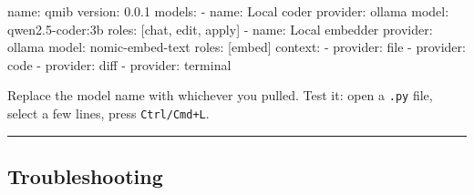 \documentclass[
  letterpaper,
  10pt,
  twoside,
  openright,
  numbers=noenddot,
  chapterprefix=true]{scrbook}
\newenvironment{Shaded}{}{}
\newcommand{\AttributeTok}[1]{\textcolor[rgb]{0.84,0.23,0.29}{#1}}
\newcommand{\FloatTok}[1]{\textcolor[rgb]{0.00,0.36,0.77}{#1}}
\newcommand{\FunctionTok}[1]{\textcolor[rgb]{0.44,0.26,0.76}{#1}}
\newcommand{\KeywordTok}[1]{\textcolor[rgb]{0.84,0.23,0.29}{#1}}
\begin{document}
\begin{Shaded}
\begin{Highlighting}[]
\FunctionTok{name}\KeywordTok{:}\AttributeTok{ qmib}
\FunctionTok{version}\KeywordTok{:}\AttributeTok{ }\FloatTok{0.0.1}
\FunctionTok{models}\KeywordTok{:}
\AttributeTok{  }\KeywordTok{{-}}\AttributeTok{ }\FunctionTok{name}\KeywordTok{:}\AttributeTok{ Local coder}
\AttributeTok{    }\FunctionTok{provider}\KeywordTok{:}\AttributeTok{ ollama}
\AttributeTok{    }\FunctionTok{model}\KeywordTok{:}\AttributeTok{ qwen2.5{-}coder:3b}
\AttributeTok{    }\FunctionTok{roles}\KeywordTok{:}\AttributeTok{ }\KeywordTok{[}\AttributeTok{chat}\KeywordTok{,}\AttributeTok{ edit}\KeywordTok{,}\AttributeTok{ apply}\KeywordTok{]}
\AttributeTok{  }\KeywordTok{{-}}\AttributeTok{ }\FunctionTok{name}\KeywordTok{:}\AttributeTok{ Local embedder}
\AttributeTok{    }\FunctionTok{provider}\KeywordTok{:}\AttributeTok{ ollama}
\AttributeTok{    }\FunctionTok{model}\KeywordTok{:}\AttributeTok{ nomic{-}embed{-}text}
\AttributeTok{    }\FunctionTok{roles}\KeywordTok{:}\AttributeTok{ }\KeywordTok{[}\AttributeTok{embed}\KeywordTok{]}
\FunctionTok{context}\KeywordTok{:}
\AttributeTok{  }\KeywordTok{{-}}\AttributeTok{ }\FunctionTok{provider}\KeywordTok{:}\AttributeTok{ file}
\AttributeTok{  }\KeywordTok{{-}}\AttributeTok{ }\FunctionTok{provider}\KeywordTok{:}\AttributeTok{ code}
\AttributeTok{  }\KeywordTok{{-}}\AttributeTok{ }\FunctionTok{provider}\KeywordTok{:}\AttributeTok{ diff}
\AttributeTok{  }\KeywordTok{{-}}\AttributeTok{ }\FunctionTok{provider}\KeywordTok{:}\AttributeTok{ terminal}
\end{Highlighting}
\end{Shaded}

Replace the model name with whichever you pulled. Test it: open a
\texttt{.py} file, select a few lines, press \texttt{Ctrl/Cmd+L}.

\begin{center}\rule{0.5\linewidth}{0.5pt}\end{center}

\subsection{Troubleshooting}\label{troubleshooting}
\end{document}
